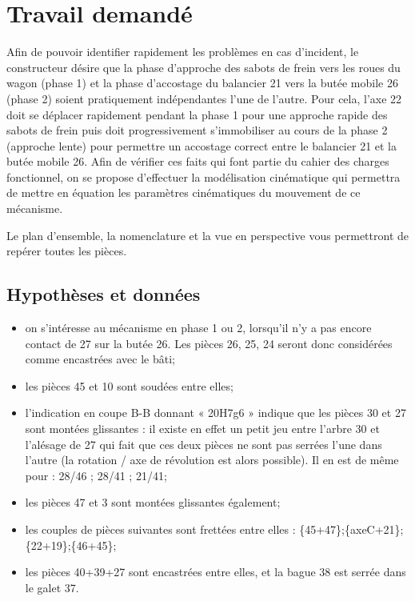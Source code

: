 \documentclass[11pt,oneside]{article}
\begin{document}
 
 \section{Travail demandé}
	
 
Afin de pouvoir identifier rapidement les problèmes en cas d'incident, le constructeur désire que la phase d'approche des sabots de frein vers les roues du wagon (phase 1) et la phase d'accostage du balancier 21 vers la butée mobile 26 (phase 2) soient pratiquement indépendantes l'une de l'autre. Pour cela, l'axe 22 doit se déplacer rapidement pendant la phase 1 pour une approche rapide des sabots de frein puis doit progressivement s'immobiliser au cours de la phase 2 (approche lente) pour permettre un accostage correct entre le balancier 21 et la butée mobile 26.
Afin de vérifier ces faits qui font partie du cahier des charges fonctionnel, on se propose d'effectuer la modélisation cinématique qui permettra de mettre en équation les paramètres cinématiques du mouvement de ce mécanisme.
 
Le plan d'ensemble, la nomenclature et la vue en perspective vous permettront de repérer toutes les pièces.
\subsection*{Hypothèses et données}
\begin{itemize}
\item on s'intéresse au mécanisme en phase 1 ou 2, lorsqu'il n'y a pas encore contact de 27 sur la butée 26. Les pièces 26, 25, 24 seront donc considérées comme encastrées avec le bâti;
\item les pièces 45 et 10 sont soudées entre elles;
\item l'indication en coupe B-B donnant « 20H7g6 » indique que les pièces 30 et 27 sont montées glissantes : il existe en effet un petit jeu entre l'arbre 30 et l'alésage de 27 qui fait que ces deux pièces ne sont pas serrées l'une dans l'autre (la rotation / axe de révolution est alors possible).
Il en est de même pour : 28/46 ; 28/41 ; 21/41;
\item les pièces 47 et 3 sont montées glissantes également;
\item les couples de pièces suivantes sont frettées entre elles : \{45+47\};\{axeC+21\};\{22+19\};\{46+45\};
\item les pièces 40+39+27 sont encastrées entre elles, et la bague 38 est serrée dans le galet 37.
\end{itemize}
\end{document}
